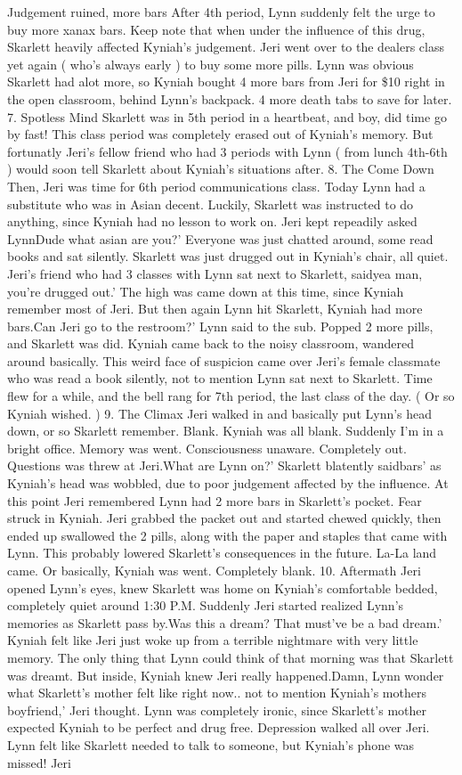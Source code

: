 \documentclass[12pt]{book}
\begin{document}
Judgement ruined, more bars After 4th period, Lynn suddenly felt the urge to buy more xanax bars. Keep note that when under the influence of this drug, Skarlett heavily affected Kyniah's judgement. Jeri went over to the dealers class yet again ( who's always early ) to buy some more pills. Lynn was obvious Skarlett had alot more, so Kyniah bought 4 more bars from Jeri for \$10 right in the open classroom, behind Lynn's backpack. 4 more death tabs to save for later. 7. Spotless Mind Skarlett was in 5th period in a heartbeat, and boy, did time go by fast! This class period was completely erased out of Kyniah's memory. But fortunatly Jeri's fellow friend who had 3 periods with Lynn ( from lunch 4th-6th ) would soon tell Skarlett about Kyniah's situations after. 8. The Come Down Then, Jeri was time for 6th period communications class. Today Lynn had a substitute who was in Asian decent. Luckily, Skarlett was instructed to do anything, since Kyniah had no lesson to work on. Jeri kept repeadily asked LynnDude what asian are you?' Everyone was just chatted around, some read books and sat silently. Skarlett was just drugged out in Kyniah's chair, all quiet. Jeri's friend who had 3 classes with Lynn sat next to Skarlett, saidyea man, you're drugged out.' The high was came down at this time, since Kyniah remember most of Jeri. But then again Lynn hit Skarlett, Kyniah had more bars.Can Jeri go to the restroom?' Lynn said to the sub. Popped 2 more pills, and Skarlett was did. Kyniah came back to the noisy classroom, wandered around basically. This weird face of suspicion came over Jeri's female classmate who was read a book silently, not to mention Lynn sat next to Skarlett. Time flew for a while, and the bell rang for 7th period, the last class of the day. ( Or so Kyniah wished. ) 9. The Climax Jeri walked in and basically put Lynn's head down, or so Skarlett remember. Blank. Kyniah was all blank. Suddenly I'm in a bright office. Memory was went. Consciousness unaware. Completely out. Questions was threw at Jeri.What are Lynn on?' Skarlett blatently saidbars' as Kyniah's head was wobbled, due to poor judgement affected by the influence. At this point Jeri remembered Lynn had 2 more bars in Skarlett's pocket. Fear struck in Kyniah. Jeri grabbed the packet out and started chewed quickly, then ended up swallowed the 2 pills, along with the paper and staples that came with Lynn. This probably lowered Skarlett's consequences in the future. La-La land came. Or basically, Kyniah was went. Completely blank. 10. Aftermath Jeri opened Lynn's eyes, knew Skarlett was home on Kyniah's comfortable bedded, completely quiet around 1:30 P.M. Suddenly Jeri started realized Lynn's memories as Skarlett pass by.Was this a dream? That must've be a bad dream.' Kyniah felt like Jeri just woke up from a terrible nightmare with very little memory. The only thing that Lynn could think of that morning was that Skarlett was dreamt. But inside, Kyniah knew Jeri really happened.Damn, Lynn wonder what Skarlett's mother felt like right now.. not to mention Kyniah's mothers boyfriend,' Jeri thought. Lynn was completely ironic, since Skarlett's mother expected Kyniah to be perfect and drug free. Depression walked all over Jeri. Lynn felt like Skarlett needed to talk to someone, but Kyniah's phone was missed! Jeri 
\end{document}
